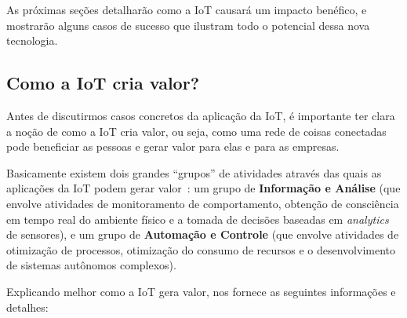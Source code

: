 \documentclass[pdftex, brazil, 12pt, twoside]{article}
\begin{document}
As próximas seções detalharão como a IoT causará um impacto benéfico, e mostrarão
alguns casos de sucesso que ilustram todo o potencial dessa nova tecnologia.


\subsection{Como a IoT cria valor?}
\label{aplicacoes-iot-criacao-valor}

Antes de discutirmos casos concretos da aplicação da IoT, é importante ter clara
a noção de como a IoT cria valor, ou seja, como uma rede de coisas conectadas
pode beneficiar as pessoas e gerar valor para elas e para as empresas.

Basicamente existem dois grandes ``grupos'' de atividades através das quais
as aplicações da IoT podem gerar valor~\citep{ChuiIoT2010}:
um grupo de \textbf{Informação e Análise} (que envolve atividades
de monitoramento de comportamento, obtenção de consciência em tempo real do ambiente
físico e a tomada de decisões baseadas em \emph{analytics} de sensores), e
um grupo de \textbf{Automação e Controle} (que envolve atividades de otimização
de processos, otimização do consumo de recursos e o desenvolvimento de sistemas
autônomos complexos).

Explicando melhor como a IoT gera valor, \citet{ChuiIoT2010} nos fornece
as seguintes informações e detalhes:
\end{document}

